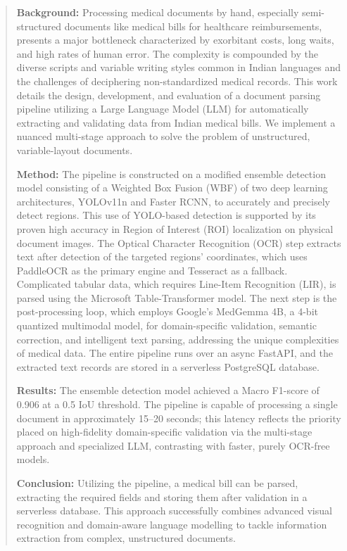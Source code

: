 \documentclass[conference,twocolumn]{IEEEtran}
\begin{document}
\begin{abstract}
\textbf{Background:} Processing medical documents by hand, especially semi-structured documents like medical bills for healthcare reimbursements, presents a major bottleneck characterized by exorbitant costs, long waits, and high rates of human error. The complexity is compounded by the diverse scripts and variable writing styles common in Indian languages and the challenges of deciphering non-standardized medical records. This work details the design, development, and evaluation of a document parsing pipeline utilizing a Large Language Model (LLM) for automatically extracting and validating data from Indian medical bills. We implement a nuanced multi-stage approach to solve the problem of unstructured, variable-layout documents.

\textbf{Method:} The pipeline is constructed on a modified ensemble detection model consisting of a Weighted Box Fusion (WBF) of two deep learning architectures, YOLOv11n and Faster RCNN, to accurately and precisely detect regions. This use of YOLO-based detection is supported by its proven high accuracy in Region of Interest (ROI) localization on physical document images. The Optical Character Recognition (OCR) step extracts text after detection of the targeted regions' coordinates, which uses PaddleOCR as the primary engine and Tesseract as a fallback. Complicated tabular data, which requires Line-Item Recognition (LIR), is parsed using the Microsoft Table-Transformer model. The next step is the post-processing loop, which employs Google's MedGemma 4B, a 4-bit quantized multimodal model, for domain-specific validation, semantic correction, and intelligent text parsing, addressing the unique complexities of medical data. The entire pipeline runs over an async FastAPI, and the extracted text records are stored in a serverless PostgreSQL database.

\textbf{Results:} The ensemble detection model achieved a Macro F1-score of 0.906 at a 0.5 IoU threshold. The pipeline is capable of processing a single document in approximately 15--20 seconds; this latency reflects the priority placed on high-fidelity domain-specific validation via the multi-stage approach and specialized LLM, contrasting with faster, purely OCR-free models.

\textbf{Conclusion:} Utilizing the pipeline, a medical bill can be parsed, extracting the required fields and storing them after validation in a serverless database. This approach successfully combines advanced visual recognition and domain-aware language modelling to tackle information extraction from complex, unstructured documents.
\end{abstract}
\end{document}
